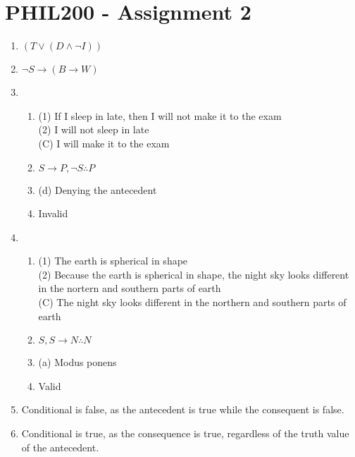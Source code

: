 \documentclass{article}
\begin{document}
\section*{PHIL200 - Assignment 2}

\begin{enumerate}
    \item $(T \lor (D \land \neg I))$
    \item $\neg S \to (B \to W)$
    \item \begin{enumerate}[label=\roman*.]
              \item (1) If I sleep in late, then I will not make it to the exam\\
                    (2) I will not sleep in late \\
                    (C) I will make it to the exam \\
              \item $S \to P, \neg S \therefore P$
              \item (d) Denying the antecedent
              \item Invalid
          \end{enumerate}
    \item \begin{enumerate}[label=\roman*.]
              \item (1) The earth is spherical in shape\\
                    (2) Because the earth is spherical in shape, the night sky looks different in the nortern and southern parts of earth\\
                    (C) The night sky looks different in the northern and southern parts of earth\\
              \item $S, S \to N \therefore N$
              \item (a) Modus ponens
              \item Valid
          \end{enumerate}
    \item Conditional is false, as the antecedent is true while the consequent is false.
    \item Conditional is true, as the consequence is true, regardless of the truth value of the antecedent.
\end{enumerate}
\end{document}
